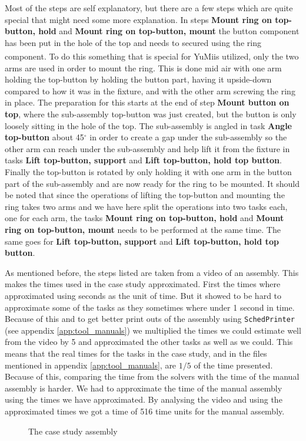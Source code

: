 \noindent Most of the steps are self explanatory, but there are a few steps which are quite special that might need some more explanation. In steps \textbf{Mount ring on top-button, hold} and \textbf{Mount ring on top-button, mount} the button component has been put in the hole of the top and needs to secured using the ring component. To do this something that is special for YuMi\textsuperscript\textregistered is utilized, only the two arms are used in order to mount the ring. This is done mid air with one arm holding the top-button by holding the button part, having it upside-down compared to how it was in the fixture, and with the other arm screwing the ring in place. The preparation for this starts at the end of step \textbf{Mount button on top}, where the sub-assembly top-button was just created, but the button is only loosely sitting in the hole of the top. The sub-assembly is angled in task \textbf{Angle top-button} about 45$^\circ$ in order to create a gap under the sub-assembly so the other arm can reach under the sub-assembly and help lift it from the fixture in tasks \textbf{Lift top-button, support} and \textbf{Lift top-button, hold top button}. Finally the top-button is rotated by only holding it with one arm in the button part of the sub-assembly and are now ready for the ring to be mounted.
It should be noted that since the operations of lifting the top-button and mounting the ring takes two arms and we have here split the operations into two tasks each, one for each arm, the tasks \textbf{Mount ring on top-button, hold} and \textbf{Mount ring on top-button, mount} needs to be performed at the same time. The same goes for  \textbf{Lift top-button, support} and \textbf{Lift top-button, hold top button}.

As mentioned before, the steps listed are taken from a video of an assembly. This makes the times used in the case study approximated. First the times where approximated using seconds as the unit of time. But it showed to be hard to approximate some of the tasks as they sometimes where under 1 second in time. Because of this and to get better print outs of the assembly using \texttt{SchedPrinter} (see appendix \ref{app:tool_manuals}) we multiplied the times we could estimate well from the video by 5 and approximated the other tasks as well as we could. This means that the real times for the tasks in the case study, and in the files mentioned in appendix \ref{app:tool_manuals}, are $1/5$ of the time presented. Because of this, comparing the time from the solvers with the time of the manual assembly is harder. We had to approximate the time of the manual assembly using the times we have approximated. By analysing the video and using the approximated times we got a time of 516 time units for the manual assembly.

\begin{landscape}
\begin{figure}

\caption{The case study assembly}
\label{fig:assembly}
\end{figure}
\end{landscape}

%